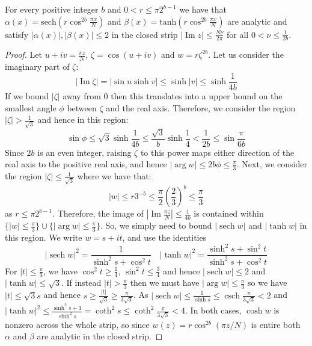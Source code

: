 \begin{lemma}
    For every positive integer $b$ and $0 < r \leq \pi2^{b-1}$ we have that $\alpha(x)= \text{sech}( r\cos^{2b} \frac{\pi x}{N})$ and $\beta(x) = \text{tanh}(r \cos^{2b} \frac{\pi x}{N})$ are analytic and satisfy $|\alpha(x)|, |\beta(x)| \leq 2$ in the closed strip $| \operatorname{Im} z| \leq \frac{N\nu}{2\pi}$ for all $0 < \nu \leq \frac{1}{2b}$. 
    \label{lemma:appendixc}
\end{lemma}
\begin{proof}
    Let $u + iv = \frac{\pi z}{N}$, $\zeta = \cos (u+iv)$ and $w = r \zeta^{2b}$. Let us consider the imaginary part of $\zeta$:
    \begin{equation}
        |\operatorname{Im} \zeta |  = | \sin u \sinh v | \leq \sinh |v|  \leq \sinh \frac{1}{4b}
    \end{equation}
    If we bound $|\zeta|$ away from $0$ then this translates into a upper bound on the smallest angle $\phi$ between $\zeta$ and the real axis. Therefore, we consider the region $| \zeta | > \frac{1}{\sqrt{3}}$ and hence in this region:
    \begin{equation}
       \sin \phi  \leq \sqrt{3}\sinh \frac{1}{4b} \leq \frac{\sqrt{3}}{b} \sinh\frac{1}{4} < \frac{1}{2b} \leq \sin \frac{\pi}{6b}
    \end{equation}
    Since $2b$ is an even integer, raising $\zeta$ to this power maps either direction of the real axis to the positive real axis, and hence $|\arg w|\le2b\phi\le \frac{\pi}{3}$. Next, we consider the region $|\zeta| \leq \frac{1}{\sqrt{3}}$ where we have that:
    \begin{equation}
        |w| \leq r 3^{-b}\leq \frac{\pi}{2}\left(\frac{2}{3}\right)^b \leq \frac{\pi}{3}
    \end{equation}
    as $r \leq \pi2^{b-1}$. Therefore, the image of $| \operatorname{Im} \frac{\pi z}{N}| \leq \frac{1}{4b}$ is contained within $\{ |w| \leq \frac{\pi}{3}\} \cup \{|\arg w| \leq \frac{\pi}{3}\}$. So, we simply need to bound $|\operatorname{sech} w|$ and $|\operatorname{tanh} w|$ in this region. We write $w = s + it$, and use the identities
    \begin{equation}
        |\operatorname{sech} w|^2 = \frac{1}{\sinh^2 s + \cos^2 t} \quad |\operatorname{tanh} w|^2 = \frac{\sinh^2 s + \sin^2 t}{\sinh^2 s + \cos^2 t}
    \end{equation}
    For $|t| \leq \frac{\pi}{3}$, we have $\cos^2 t \geq \frac{1}{4}$, $\sin^2 t \leq \frac{3}{4}$ and hence $|\operatorname{sech} w| \leq 2$ and $|\operatorname{tanh} w| \leq \sqrt{3}$. If instead $|t| > \frac{\pi}{3}$ then we must have $|\arg w| \leq \frac{\pi}{3}$ so we have $|t| \leq \sqrt{3}s$ and hence $s \geq \frac{|t|}{\sqrt{3}} \geq \frac{\pi}{3\sqrt{3}}$. As $|\operatorname{sech} w| \leq \frac{1}{\sinh s} \leq \operatorname{csch} \frac{\pi}{3\sqrt{3}} < 2$ and $|\tanh w|^2 \leq \frac{\sinh^2 s +1}{\sinh^2 s} = \operatorname{coth}^2 s \leq \operatorname{coth}^2 \frac{\pi}{3\sqrt{3}} < 4$. In both cases, $\cosh w$ is nonzero across the whole strip, so since $w(z)=r\cos^{2b}(\pi z/N)$ is entire both $\alpha$ and $\beta$ are analytic in the closed strip.
\end{proof}


